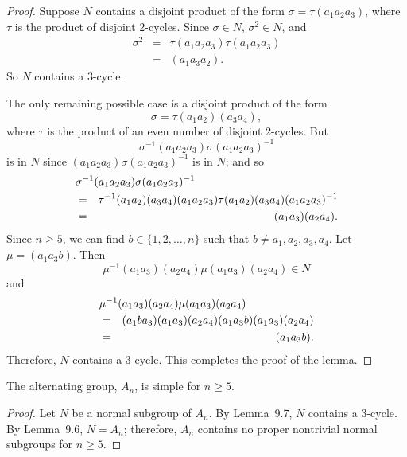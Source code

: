 \begin{proof}
 
Suppose $N$ contains a disjoint product of the form $\sigma = \tau(a_1
a_2 a_3)$, where $\tau$ is the product of disjoint 2-cycles. Since
$\sigma \in N$, $\sigma^2 \in N$, and
\begin{eqnarray*}
\sigma^2
& = & \tau(a_1 a_2 a_3)\tau(a_1 a_2 a_3) \\
& = &(a_1 a_3 a_2).
\end{eqnarray*}
So $N$ contains a 3-cycle.
 
 
The only remaining possible case is a disjoint product of the form
$$
\sigma = \tau (a_1 a_2) (a_3 a_4),
$$
where $\tau$ is the product of an even number of disjoint 2-cycles.
But 
$$
\sigma^{-1}(a_1 a_2 a_3)\sigma(a_1 a_2 a_3)^{-1}
$$
is in $N$ since $(a_1 a_2 a_3)\sigma(a_1 a_2 a_3)^{-1}$ is in $N$; and
so 
\begin{eqnarray*}
\lefteqn{\sigma^{-1}(a_1 a_2 a_3)\sigma(a_1 a_2 a_3)^{-1} } \\
& = & \tau^{-1} (a_1 a_2) (a_3 a_4) (a_1 a_2 a_3) 
      \tau (a_1 a_2)(a_3 a_4)(a_1 a_2 a_3)^{-1} \\
& = & (a_1 a_3)(a_2 a_4).
\end{eqnarray*}
Since $n \geq 5$, we can find $b \in \{1, 2, \ldots, n \}$ such that
$b \neq a_1, a_2, a_3, a_4$. Let $\mu = (a_1 a_3 b)$. Then
$$
\mu^{-1} (a_1 a_3)(a_2 a_4) \mu (a_1 a_3)(a_2 a_4) \in N
$$
and
\begin{eqnarray*}
\lefteqn{\mu^{-1} (a_1 a_3)(a_2 a_4) \mu (a_1 a_3)(a_2 a_4) } \\
& = & (a_1 b a_3)(a_1 a_3)(a_2 a_4) 
      (a_1 a_3 b)(a_1 a_3)(a_2 a_4) \\
& = & (a_1 a_3 b ).
\end{eqnarray*}
Therefore, $N$ contains a 3-cycle. This completes the proof of the
lemma.  
\end{proof}
 
 
\begin{theorem}
The alternating group, $A_n$, is simple for $n \geq 5$. 
\end{theorem}
 
\begin{proof}
Let $N$ be a normal subgroup of $A_n$. By Lemma~9.7, $N$ contains a
3-cycle. By Lemma~9.6, $N = A_n$; therefore, $A_n$ contains no proper
nontrivial normal subgroups for $n \geq 5$.
\end{proof} 
 
 
\histhead
 
